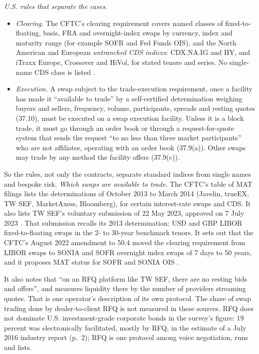 \begin{qfdefinition}
\emph{U.S. rules that separate the cases}.
\begin{itemize}
\item \emph{Clearing.} The CFTC's clearing requirement covers named classes of fixed-to-floating, basis, FRA and overnight-index swaps by currency, index and maturity range (for example SOFR and Fed Funds OIS), and the North American and European \emph{untranched CDS indices}: CDX.NA.IG and HY, and iTraxx Europe, Crossover and HiVol, for stated tenors and series. No single-name CDS class is listed \citep[17 CFR 50.4(a)--(b), last amended 91~FR 57086, 8 September 2026]{ecfr-17cfr-cftc-swaps}.
\item \emph{Execution.} A swap subject to the trade-execution requirement, once a facility has made it ``available to trade'' by a self-certified determination weighing buyers and sellers, frequency, volume, participants, spreads and resting quotes (37.10), must be executed on a swap execution facility. Unless it is a block trade, it must go through an order book or through a request-for-quote system that sends the request ``to no less than three market participants'' who are not affiliates, operating with an order book (37.9(a)). Other swaps may trade by any method the facility offers (37.9(c)).
\end{itemize}
So the rules, not only the contracts, separate standard indices from single names and bespoke risk. \emph{Which swaps are available to trade}. The CFTC's table of MAT filings lists the determinations of October 2013 to March 2014 (Javelin, trueEX, TW SEF, MarketAxess, Bloomberg), for certain interest-rate swaps and CDS. It also lists TW SEF's voluntary submission of 22 May 2023, approved on 7 July 2023 \citep[``Swaps Made Available to Trade Determination'' table]{cftc-smatd-filings}. That submission recalls its 2013 determination: USD and GBP LIBOR fixed-to-floating swaps in the 2- to 30-year benchmark tenors. It sets out that the CFTC's August 2022 amendment to 50.4 moved the clearing requirement from LIBOR swaps to SONIA and SOFR overnight index swaps of 7 days to 50 years, and it proposes MAT status for SOFR and SONIA OIS \citep[TW SEF letter of 22 May 2023, pp.~1--3]{twsef-mat-2023}.

It also notes that ``on an RFQ platform like TW SEF, there are no resting bids and offers'', and measures liquidity there by the number of providers streaming quotes. That is one operator's description of its own protocol. The share of swap trading done by dealer-to-client RFQ is not measured in these sources. RFQ does not dominate U.S. investment-grade corporate bonds in the survey's figure: 19 percent was electronically facilitated, mostly by RFQ, in the estimate of a July 2016 industry report (p.~2); RFQ is one protocol among voice negotiation, runs and lists.


\end{qfdefinition}
